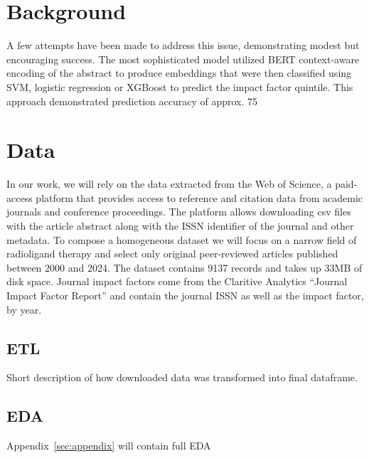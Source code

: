 \documentclass[11pt]{article}
\begin{document}
\section{Background}
A few attempts have been made to address this issue, demonstrating modest but encouraging success. \citep{Macri2023-tr, Alohali2022-no, 10.1162/qss_a_00258, doi:10.1152/japplphysiol.00489.2020} The most sophisticated model utilized BERT context-aware encoding of the abstract to produce embeddings that were then classified using  SVM, logistic regression or XGBoost to predict the impact factor quintile. This approach demonstrated prediction accuracy of approx. 75%

\section{Data}
In our work, we will rely on the data extracted from the Web of Science, a paid-access platform that provides access to reference and citation data from academic journals and conference proceedings. The platform allows downloading csv files with the article abstract along with the ISSN identifier of the journal and other metadata. To compose a homogeneous dataset we will focus on a narrow field of radioligand therapy and select only original peer-reviewed articles published between 2000 and 2024. The dataset contains 9137 records and takes up 33MB of disk space. Journal impact factors come from the Claritive Analytics “Journal Impact Factor Report” and contain the journal ISSN as well as the impact factor, by year.
\subsection{ETL}
Short description of how downloaded data was transformed into final dataframe. 
\subsection{EDA}
Appendix~\ref{sec:appendix} will contain full EDA
\end{document}
